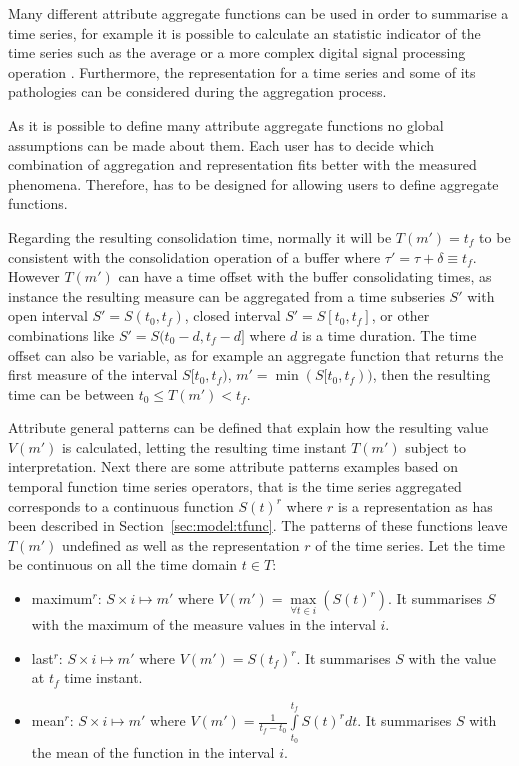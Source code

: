 Many different attribute aggregate functions can be used in order to
summarise a time series, for example it is possible to calculate an
statistic indicator of the time series such as the average or a more
complex digital signal processing operation
\cite{zhang11}. Furthermore, the representation for a time series and
some of its pathologies can be considered during the aggregation
process.


As it is possible to define many attribute aggregate
functions no global assumptions can be made about them. Each user has
to decide which combination of aggregation and representation fits
better with the measured phenomena.  Therefore,  has to be
designed for allowing users to define aggregate functions.





Regarding the resulting consolidation time, normally it will be
$T(m')=t_f$ to be consistent with the consolidation operation of a
buffer where $\tau' = \tau + \delta \equiv t_f$. However $T(m')$ can
have a time offset with the buffer consolidating times, as instance
the resulting measure can be aggregated from a time subseries $S'$
with open interval $S'=S(t_0,t_f)$, closed interval $S'=S[t_0,t_f]$,
or other combinations like $S'=S(t_0-d,t_f-d]$ where $d$ is a time
duration.  The time offset can also be variable, as for example an
aggregate function that returns the first measure of the interval
$S[t_0,t_f)$, $m'=\min(S[t_0,t_f))$, then the resulting time can be
between $t_0 \leq T(m') < t_f$.


Attribute general patterns can be defined that explain how the
resulting value $V(m')$ is calculated, letting the resulting time
instant $T(m')$ subject to interpretation.  Next there are some
attribute patterns examples based on temporal function time series
operators, that is the time series aggregated corresponds to a
continuous function $S(t)^r$ where $r$ is a representation as has been
described in Section~\ref{sec:model:tfunc}. The patterns of these
functions leave $T(m')$ undefined as well as the representation $r$ of
the time series. Let the time be continuous on all the time domain
$t\in T$:
\begin{itemize}
\item maximum$^r$: $S \times i \mapsto m'$ where $V(m') =
  \max\limits_{\forall t \in i}(S(t)^r)$. It summarises $S$ with the maximum
  of the measure values in the interval $i$.
\item last$^r$: $S \times i \mapsto m'$ where $V(m') = S(t_f)^r$. It
  summarises $S$ with the value at $t_f$ time instant.
\item mean$^r$: $S \times i \mapsto m'$ where $V(m') =
  \frac{1}{t_f-t_0} \int\limits_{t_0}^{t_f} S(t)^r dt$. It summarises $S$
  with the mean of the function in the interval $i$.
\end{itemize}


